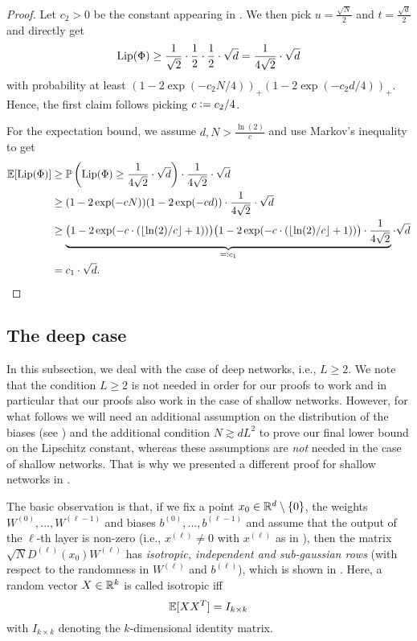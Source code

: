 \renewcommand*{\proofname}{Proof of \Cref{thm:main_shallow_lower}}
\begin{proof}
Let $c_2>0$ be the constant appearing in . We then pick $u = \frac{\sqrt{N}}{2}$ and $t = \frac{\sqrt{d}}{2}$ and directly get
\begin{equation*}
\operatorname{Lip}(\Phi) \geq \frac{1}{\sqrt{2}} \cdot \frac{1}{2} \cdot \frac{1}{2} \cdot \sqrt{d} = \frac{1}{4\sqrt{2}} \cdot \sqrt{d}
\end{equation*}
with probability at least $(1-2\exp(-c_2 N/4))_+(1-2\exp(-c_2 d/4))_+$. 
Hence, the first claim follows picking $c \mathrel{\mathop:}= c_2/4$.

For the expectation bound, we assume $d,N > \frac{\ln(2)}{c}$ and use Markov's inequality to get
\begin{align*}
\mathbb{E}[\operatorname{Lip}(\Phi)] &\geq \mathbb{P}\left(\operatorname{Lip}(\Phi) \geq \frac{1}{4\sqrt{2}} \cdot \sqrt{d}\right) \cdot \frac{1}{4\sqrt{2}} \cdot \sqrt{d} \\
&\geq (1- 2 \exp(-cN))(1-2\exp(-cd)) \cdot \frac{1}{4\sqrt{2}} \cdot \sqrt{d} \\
&\geq \underbrace{\big(1- 2 \exp(-c\cdot\left(\lfloor \ln(2) / c\rfloor + 1\right))\big)\big(1-2\exp(-c\cdot\left(\lfloor \ln(2) / c\rfloor + 1\right))\big) \cdot \frac{1}{4\sqrt{2}}}_{=: c_1} \cdot \sqrt{d} \\
&= c_1 \cdot \sqrt{d}. \qedhere
\end{align*}
\end{proof}
\renewcommand*{\proofname}{Proof}


\subsection{The deep case} \label{subsec:deep_lower}
In this subsection, we deal with the case of deep networks, i.e., $L \geq 2$. 
We note that the condition $L \geq 2$ is not needed in order for our proofs to work and in particular that our proofs also work in the case of shallow networks. 
However, for what follows we will need an additional assumption on the distribution of the biases (see ) and the additional condition $N \gtrsim dL^2$ to prove our final lower bound on the Lipschitz constant,
whereas these assumptions are \emph{not} needed in the case of shallow networks. 
That is why we presented a different proof for shallow networks in .

The basic observation is that, if we fix a point $x_0 \in \mathbb{R}^d \setminus \{0\}$, the weights $W^{(0)}, ..., W^{(\ell - 1)}$ and biases $b^{(0)}, ..., b^{(\ell -1 )}$ and assume that the output of the $\ell$-th layer is non-zero (i.e., $x^{(\ell)} \neq 0$ with $x^{(\ell)}$ as in ), 
then the matrix $\sqrt{N} D^{(\ell)}(x_0) W^{(\ell)}$ has \emph{isotropic, independent and sub-gaussian rows} (with respect to the randomness in $W^{(\ell)}$ and $b^{(\ell)}$), 
which is shown in . 
Here, a random vector $X \in \mathbb{R}^k$ is called isotropic iff
\begin{equation*}
\mathbb{E}[X X^T] = I_{k \times k}
\end{equation*}
with $I_{k \times k}$ denoting the $k$-dimensional identity matrix. 

